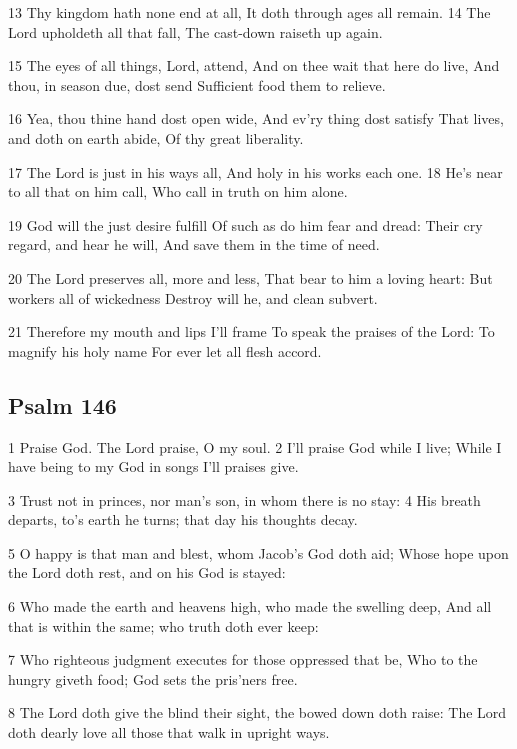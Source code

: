 13 Thy kingdom hath none end at all,
It doth through ages all remain.
14 The Lord upholdeth all that fall,
The cast-down raiseth up again.

15 The eyes of all things, Lord, attend,
And on thee wait that here do live,
And thou, in season due, dost send
Sufficient food them to relieve.

16 Yea, thou thine hand dost open wide,
And ev’ry thing dost satisfy
That lives, and doth on earth abide,
Of thy great liberality.

17 The Lord is just in his ways all,
And holy in his works each one.
18 He’s near to all that on him call,
Who call in truth on him alone.

19 God will the just desire fulfill
Of such as do him fear and dread:
Their cry regard, and hear he will,
And save them in the time of need.

20 The Lord preserves all, more and less,
That bear to him a loving heart:
But workers all of wickedness
Destroy will he, and clean subvert.

21 Therefore my mouth and lips I’ll frame
To speak the praises of the Lord:
To magnify his holy name
For ever let all flesh accord.

\begin{center}
\quad{}\quad{}
\end{center}

\subsection*{Psalm 146}

1 Praise God. The Lord praise, O my soul.
2 I’ll praise God while I live;
While I have being to my God
in songs I’ll praises give.

3 Trust not in princes, nor man’s son,
in whom there is no stay:
4 His breath departs, to’s earth he turns;
that day his thoughts decay.

5 O happy is that man and blest,
whom Jacob’s God doth aid;
Whose hope upon the Lord doth rest,
and on his God is stayed:

6 Who made the earth and heavens high,
who made the swelling deep,
And all that is within the same;
who truth doth ever keep:

7 Who righteous judgment executes
for those oppressed that be,
Who to the hungry giveth food;
God sets the pris’ners free.

8 The Lord doth give the blind their sight,
the bowed down doth raise:
The Lord doth dearly love all those
that walk in upright ways.


